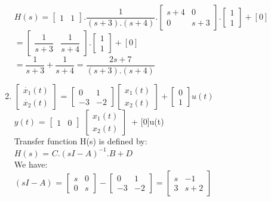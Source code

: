 \documentclass[14pt,a4paper]{article}
\begin{document}
\begin{enumerate}
	$H(s) = \begin{bmatrix}1&1\end{bmatrix}. \dfrac{1}{(s+3).(s+4)}.\begin{bmatrix} s+4 & 0 \\ 0 & s+3	\end{bmatrix} .\begin{bmatrix} 1 \\ 1\end{bmatrix} + [0]$ \\
	
	$ = \begin{bmatrix} \dfrac{1}{s+3} & \dfrac{1}{s+4} \end{bmatrix}.\begin{bmatrix} 1 \\ 1\end{bmatrix} + [0]$ \\
	
	$ = \dfrac{1}{s+3} + \dfrac{1}{s+4}  = \dfrac{2s+7}{(s+3).(s+4)}$ \\
	
	\item
	$\begin{bmatrix}\dot{x_1}(t)\\ \dot{x_2}(t) \end{bmatrix}$ = $\begin{bmatrix} 0 & 1 \\ -3&-2 \end{bmatrix} \begin{bmatrix}x_1(t) \\ x_2(t) \end{bmatrix} + \begin{bmatrix} 0\\1 \end{bmatrix}u(t)$ \\
	
	$y(t)$ = $\begin{bmatrix} 1&0 \end{bmatrix}$ $\begin{bmatrix} x_1(t)\\x_2(t) \end{bmatrix}$\ + [0]u(t) \\
	
	Transfer function H(s) is defined by: \\
	$H(s)$ = $C.(sI-A)^{-1}.B + D$ \\
		We have: \\
	$(sI-A)$ = $\begin{bmatrix} s&0 \\ 0&s	\end{bmatrix} - \begin{bmatrix}
	0 & 1 \\ -3 & -2 \end{bmatrix} = \begin{bmatrix} s & -1 \\ 3 & s+2	\end{bmatrix}$\\
	

\end{enumerate}
\end{document}
